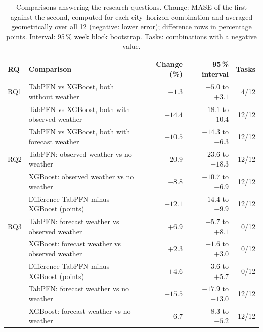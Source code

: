 \begin{table}[ht!]
\centering
\caption{Comparisons answering the research questions. Change: MASE of the first against the second, computed for each city--horizon combination and averaged geometrically over all 12 (negative: lower error); difference rows in percentage points. Interval: 95\,\% week block bootstrap. Tasks: combinations with a negative value.}
\label{tab:rq_intervals}
{\small
\begin{tabular}{llrrr}
\toprule
RQ & Comparison & Change (\%) & 95\,\% interval & Tasks \\
\midrule
RQ1 & TabPFN vs XGBoost, both without weather & $-1.3$ & $-5.0$ to $+3.1$ & 4/12 \\
 & TabPFN vs XGBoost, both with observed weather & $-14.4$ & $-18.1$ to $-10.4$ & 12/12 \\
 & TabPFN vs XGBoost, both with forecast weather & $-10.5$ & $-14.3$ to $-6.3$ & 12/12 \\
\midrule
RQ2 & TabPFN: observed weather vs no weather & $-20.9$ & $-23.6$ to $-18.3$ & 12/12 \\
 & XGBoost: observed weather vs no weather & $-8.8$ & $-10.7$ to $-6.9$ & 12/12 \\
 & Difference TabPFN minus XGBoost (points) & $-12.1$ & $-14.4$ to $-9.9$ & 12/12 \\
\midrule
RQ3 & TabPFN: forecast weather vs observed weather & $+6.9$ & $+5.7$ to $+8.1$ & 0/12 \\
 & XGBoost: forecast weather vs observed weather & $+2.3$ & $+1.6$ to $+3.0$ & 0/12 \\
 & Difference TabPFN minus XGBoost (points) & $+4.6$ & $+3.6$ to $+5.7$ & 0/12 \\
 & TabPFN: forecast weather vs no weather & $-15.5$ & $-17.9$ to $-13.0$ & 12/12 \\
 & XGBoost: forecast weather vs no weather & $-6.7$ & $-8.3$ to $-5.2$ & 12/12 \\
\bottomrule
\end{tabular}
}
\end{table}
